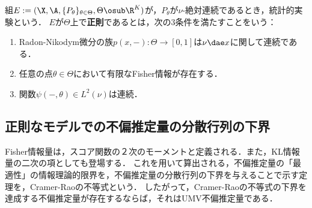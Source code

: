 \documentclass[uplatex,dvipdfmx]{jsreport}
\begin{document}
\begin{definition}
    組$E:=(\X,\A,\{P_\theta\}_{\theta\in\Theta},\Theta\osub\R^K)$が，$P_\theta$が$\nu$-絶対連続であるとき，統計的実験という．
    $E$が$\Theta$上で\textbf{正則}であるとは，次の3条件を満たすことをいう：
    \begin{enumerate}
        \item Radon-Nikodym微分の族$p(x,-):\Theta\to[0,1]$は$\nu\dae x$に関して連続である．
        \item 任意の点$\theta\in\Theta$において有限なFisher情報が存在する．
        \item 関数$\psi(-,\theta)\in L^2(\nu)$は連続．
    \end{enumerate}
\end{definition}

\subsection{正則なモデルでの不偏推定量の分散行列の下界}

\begin{tcolorbox}[colframe=ForestGreen, colback=ForestGreen!10!white,breakable,colbacktitle=ForestGreen!40!white,coltitle=black,fonttitle=\bfseries\sffamily,
title=]
    Fisher情報量は，スコア関数の２次のモーメントと定義される．また，KL情報量の二次の項としても登場する．
    これを用いて算出される，不偏推定量の「最適性」の情報理論的限界を，不偏推定量の分散行列の下界を与えることで示す定理を，Cramer-Raoの不等式という．
    したがって，Cramer-Raoの不等式の下界を達成する不偏推定量が存在するならば，それはUMV不偏推定量である．
\end{tcolorbox}
\end{document}
